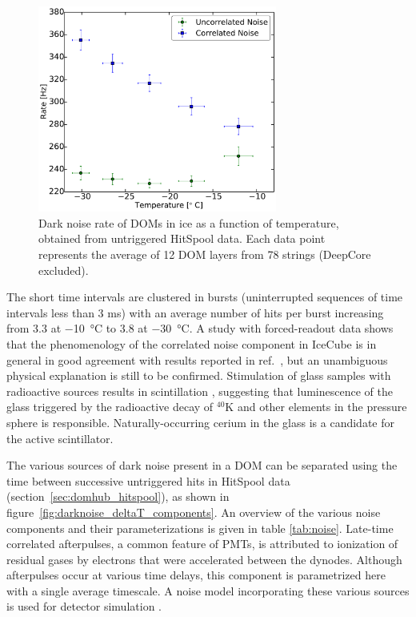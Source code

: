 \begin{figure}
  \centering
  \includegraphics[width=0.7\textwidth]{graphics/dom/performance/darknoise/HitRatevsTemp_inice_nomuons_nofit_bigfont.pdf}
  \caption{Dark noise rate of DOMs in ice as a function of temperature,
    obtained from untriggered HitSpool data. Each data point represents the
    average of 12 DOM layers from 78 strings (DeepCore excluded).} 
  \label{fig:dom_darknoise_vs_temperature}
\end{figure}

The short time intervals are clustered in bursts (uninterrupted sequences
of time intervals less than 3 ms) with an average number of
hits per burst increasing from \num{3.3} at \SI{-10}{\celsius} to \num{3.8} at
\SI{-30}{\celsius}. A study with forced-readout data shows that the
phenomenology of the correlated noise component in IceCube is in general in
good agreement with results reported in ref.~\cite{meyer_noise}, but an
unambiguous physical explanation is still to be confirmed.  Stimulation of
glass samples with radioactive sources results in scintillation
\cite{helbing_glass}, suggesting that luminescence of the glass triggered
by the radioactive decay of $^{40}\mathrm{K}$ and other elements in the
pressure sphere is responsible.  Naturally-occurring cerium in the glass is
a candidate for the active scintillator. 

The various sources of dark noise present in a DOM can be separated using
the time between successive untriggered hits in HitSpool 
data (section~\ref{sec:domhub_hitspool}), as shown in 
figure~\ref{fig:darknoise_deltaT_components}. An overview of the various 
noise components and their parameterizations is given in table \ref{tab:noise}.  Late-time
correlated afterpulses, a common feature of PMTs, is attributed to
ionization of residual gases by electrons that were accelerated between
the dynodes.  Although afterpulses occur at various time delays, this
component is parametrized here with a single average timescale.  A
noise model incorporating these various sources is used for detector
simulation \cite{larson2013simulation}. 


